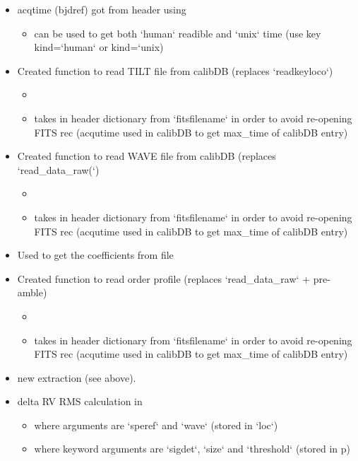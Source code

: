 \begin{itemize}
\item acqtime (bjdref) got from header using 
	\begin{itemize}
	\item can be used to get both `human` readible and `unix` time (use key kind=`human` or kind=`unix)
	\end{itemize}

\item Created function to read TILT file from calibDB (replaces `readkeyloco`)
	\begin{itemize}
	\item {}
	\item takes in header dictionary from `fitsfilename` in order to avoid re-opening FITS rec (acqutime used in calibDB to get max\_time of calibDB entry) 
	\end{itemize}

\item Created function to read WAVE file from calibDB (replaces `read\_data\_raw(`)
	\begin{itemize}
	\item {}
	\item takes in header dictionary from `fitsfilename` in order to avoid re-opening FITS rec (acqutime used in calibDB to get max\_time of calibDB entry) 
	\end{itemize}

\item Used  to get the coefficients from file

\item Created function to read order profile (replaces `read\_data\_raw` + pre-amble)
	\begin{itemize}
	\item {}
	\item takes in header dictionary from `fitsfilename` in order to avoid re-opening FITS rec (acqutime used in calibDB to get max\_time of calibDB entry) 
	\end{itemize}

\item new extraction (see \calextractRAW above).

\item delta RV RMS calculation in 
	\begin{itemize}
	\item where arguments are `speref` and `wave` (stored in `loc`)
	\item where keyword arguments are `sigdet`, `size` and `threshold` (stored in p)
	\end{itemize}


\end{itemize}

